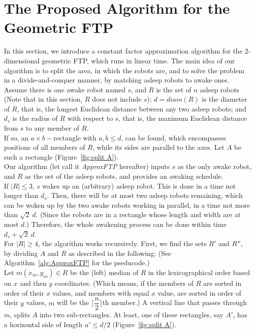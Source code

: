 \documentclass[review]{elsarticle}
\begin{document}
\section{The Proposed Algorithm for the Geometric FTP}
In this section, we introduce a constant factor approximation algorithm for the 2-dimensional geometric FTP, which runs in linear time. The main idea of our algorithm is to split the area, in which the robots are, and to solve the problem in a divide-and-conquer manner, by matching asleep robots to awake ones.\\
Assume there is one awake robot named $s$, and $R$ is the set of $n$ asleep robots (Note that in this section, $R$ does not include $s$); $d=diam(R)$ is the diameter of $R$, that is, the longest Euclidean distance between any two asleep robots; and $d_s$ is the radius of $R$ with respect to $s$, that is, the maximum Euclidean distance from $s$ to any member of $R$.\\
If so, an $a\times b-$rectangle with $a,b\leq d$, can be found, which encompasses positions of all members of $R$, while its sides are parallel to the axes. Let $A$ be such a rectangle (Figure~\ref{fig:split A}). \\
Our algorithm (let call it \textit{ApproxFTP} hereafter) inputs $s$ as the only awake robot, and $R$ as the set of the asleep robots, and provides an awaking schedule.\\
If $|R|\leq 3$, $s$ wakes up an (arbitrary) asleep robot. This is done in a time not longer than $d_s$. Then, there will be at most two asleep robots remaining, which can be woken up by the two awake robots working in parallel, in a time not more than $\sqrt{2}~d$. (Since the robots are in a rectangle whose length and width are at most $d$.) Therefore, the whole awakening process can be done within time $d_s+\sqrt{2}~d$.\\
For $|R|\geq 4$, the algorithm works recursively. First, we find the sets $R'$ and $R''$, by dividing $A$ and $R$ as described in the following:  (See Algorithm~\ref{alg:ApproxFTP} for the pseducode.)\\
Let $m(x_{m},y_{m})\in R$ be the (left) median of $R$ in the lexicographical order based on $x$ and then $y$ coordinates. (Which means, if the members of $R$ are sorted in order of their $x$ values, and members with equal $x$ value, are sorted in order of their $y$ values, $m$ will be the $\lceil\dfrac{n}{2}\rceil$th member.) A vertical line that passes through $m$, splits $A$ into two sub-rectangles. At least, one of these rectangles, say $A'$, has a horizontal side of length $a'\leq d/2$ (Figure~\ref{fig:split A}).\\
\end{document}
